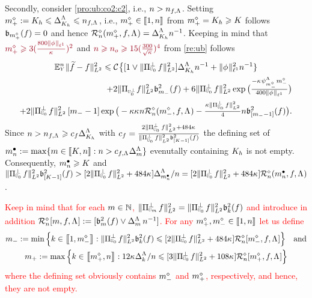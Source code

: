 \begin{pro}
Secondly, consider \ref{pro:ub:co2:c2}, i.e., 
$\ssY>\ssY_{\xdf,\iSv}$. Setting $\pdDi:=K_{\ydf}\leq\DipenSv[K_{\ydf}]\leq\ssY_{\xdf,\iSv}$, i.e., $\pdDi\in\nset{1,\ssY}$ from $\pdDi=K_{\ydf}\geq K$  follows
$\bias[\pdDi](\xdf)=0$ and hence
$\hRa{\pdDi,\xdf,\iSv}=\DipenSv[K_{\ydf}]\ssY^{-1}$. 
Keeping in mind that $\dr\pdDi\geq
3(\tfrac{800\Vnormlp[1]{\fydf}}{\cpen})^2$ and  $\dr
\ssY\geq \ssY_o\geq 15(\tfrac{300}{\sqrt{\cpen}})^4$ 
from
\cref{re:ub} follows
\begin{multline}\label{pro:ub:co2:e2}
\FuEx[\ssY]{\rY}\VnormLp{\txdf-\xdf}^2\leq\cst{}\big\{
[1\vee\VnormLp{\Proj[{\mHiH[0]}]^\perp\xdf}^2]\DipenSv[K_{\ydf}]\ssY^{-1}+\Vnormlp[1]{\fydf}^2
\ssY^{-1}\}\\\hfill
+2\VnormLp{\Proj[{\mHiH[0]^\perp}]\xdf}^2\bias[\mDi]^2(\xdf)
+6\VnormLp{\Proj[{\mHiH[0]}]^\perp\xdf}^2 \exp\big(\tfrac{-\cpen\cmSv[\mdDi]\mdDi}{400\Vnormlp[1]{\fydf}}\big)
\\\hfill
\hfill+2\VnormLp{\Proj[{\mHiH[0]}]^\perp\xdf}^2\,[\mDi-1]\exp\big(-\rWc\cpen\ssY\hRa{\mdDi,\xdf,\iSv}-
    \tfrac{\rWc\VnormLp{\Proj[{\mHiH[0]}]^\perp\xdf}^2}{4}\ssY\bias[{[\mDi-1]}]^2(\xdf)\big).
\end{multline}
Since
$\ssY>\ssY_{\xdf,\iSv}\geq c_{\xdf}\DipenSv[K_{\ydf}]$
with $c_{\xdf}=\tfrac{2\VnormLp{\Proj[{\mHiH[0]}]^\perp\xdf}^2+484\cpen}{\VnormLp{\Proj[{\mHiH[0]}]^\perp\xdf}^2\bias[{[K-1]}]^2(\xdf)}$ the defining set of
$\sDi{\ssY}:=\max\{\Di\in\nset{K,\ssY}:\ssY>c_{\xdf,\iSv}\DipenSv\}$
evenutally containing $K_{\ydf}$ is not empty. Consequently, $\sDi{\ssY}\geq K$ and $\VnormLp{\Proj[{\mHiH[0]}]^\perp\xdf}^2\bias[{[K-1]}]^2(\xdf)>[2\VnormLp{\Proj[{\mHiH[0]}]^\perp\xdf}^2+484\cpen]\DipenSv[\sDi{\ssY}]/\ssY=[2\VnormLp{\Proj[{\mHiH[0]}]^\perp\xdf}^2+484\cpen]\hRa{\sDi{\ssY},\xdf,\iSv}$.

\textcolor{red}{\begin{te}
Keep in mind that for each $\Di\in\Nz$,
$\VnormLp{\Proj[{\mHiH}]^\perp\xdf}^2=\VnormLp{\Proj[{\mHiH[0]}]^\perp\xdf}^2\bias[k]^2(\xdf)$ and
introduce in addition 
$\hRaDi{\Di,\xdf,\iSv}:=[\bias^2(\xdf)\vee \DipenSv\,\ssY^{-1}]$. For any $\pdDi,\mdDi\in\nset{1,\ssY}$ let us define 
\begin{multline}\label{de:*Di}
\mDi:=\min\set{k\in\nset{1,\mdDi}: \VnormLp{\Proj[{\mHiH[0]}]^\perp\xdf}^2\bias[k]^2(\xdf)\leq
  [2\VnormLp{\Proj[{\mHiH[0]}]^\perp\xdf}^2+484\cpen]\hRaDi{\mdDi,\xdf,\iSv}}\quad\text{and}\\\pDi:=\max\set{k\in\nset{\pdDi,\ssY}:
   \penSv[k] \leq [3\VnormLp{\Proj[{\mHiH[0]}]^\perp\xdf}^2+ 108\cpen] \hRaDi{\pdDi,\xdf,\iSv}}
\end{multline}
where  the defining set obviously contains $\mdDi$ and $\pdDi$, respectively,
and hence, they are not empty.
\end{te}}


\end{pro}
